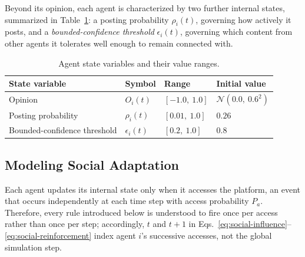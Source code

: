 \documentclass{svproc}
\def\Blue{\color[rgb]{0,0,1}}
\def\Black{\color[rgb]{0,0,0}}
\def\post{\rho}                 %
\def\BoundedConfidence{\epsilon} %
\def\Stubbornness{\mu}           %
\begin{document}
Beyond its opinion, each agent is characterized by two further
internal states, summarized in Table~\ref{tab:state}: a posting
probability $\post_i(t)$, governing how actively it posts, and a
\emph{bounded-confidence threshold} $\BoundedConfidence_i(t)$,
governing which content from other agents it tolerates well enough to
remain connected with.
\par


\begin{table}[t]\Blue
\centering
\caption{Agent state variables and their value
  ranges.}\label{tab:state}
\tabcolsep=5pt
\begin{tabular}{llll}
\toprule
State variable & Symbol & Range & Initial value \\
\midrule
Opinion & $O_i(t)$ & $[-1.0,\ 1.0]$ & $\mathcal{N}(0.0,\ 0.6^2)$ \\
Posting probability & $\post_i(t)$ & $[0.01,\ 1.0]$ & $0.26$ \\
Bounded-confidence threshold & $\BoundedConfidence_i(t)$ & $[0.2,\ 1.0]$ & $0.8$ \\
\bottomrule
\end{tabular}\Black
\end{table}



\subsection{Modeling Social Adaptation}\label{sec:model-adaptation}
Each agent updates its internal state only when it accesses the
platform, an event that occurs independently at each time step with
access probability $P_a$. Therefore, every rule introduced below is
understood to fire once per access rather than once per step;
accordingly, $t$ and $t{+}1$ in
Eqs.~\eqref{eq:social-influence}--\eqref{eq:social-reinforcement} index
agent $i$'s successive accesses, not the global simulation step.
\par
\end{document}
